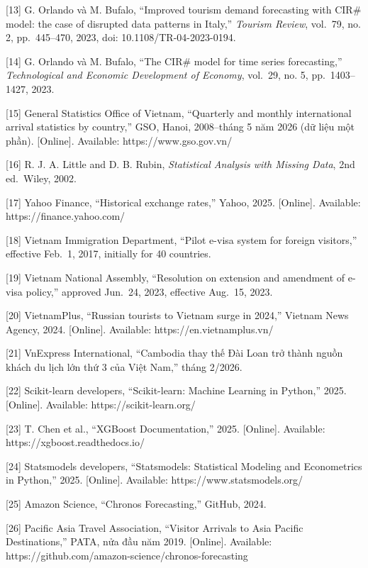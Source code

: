 \documentclass[
]{article}
\begin{document}
{[}13{]} G. Orlando và M. Bufalo, ``Improved tourism demand forecasting
with CIR\# model: the case of disrupted data patterns in Italy,''
\emph{Tourism Review}, vol.~79, no. 2, pp.~445--470, 2023, doi:
10.1108/TR-04-2023-0194.

{[}14{]} G. Orlando và M. Bufalo, ``The CIR\# model for time series
forecasting,'' \emph{Technological and Economic Development of Economy},
vol.~29, no. 5, pp.~1403--1427, 2023.

{[}15{]} General Statistics Office of Vietnam, ``Quarterly and monthly
international arrival statistics by country,'' GSO, Hanoi, 2008--tháng 5
năm 2026 (dữ liệu một phần). {[}Online{]}. Available:
https://www.gso.gov.vn/

{[}16{]} R. J. A. Little and D. B. Rubin, \emph{Statistical Analysis
with Missing Data}, 2nd ed.~Wiley, 2002.

{[}17{]} Yahoo Finance, ``Historical exchange rates,'' Yahoo, 2025.
{[}Online{]}. Available: https://finance.yahoo.com/

{[}18{]} Vietnam Immigration Department, ``Pilot e-visa system for
foreign visitors,'' effective Feb.~1, 2017, initially for 40 countries.

{[}19{]} Vietnam National Assembly, ``Resolution on extension and
amendment of e-visa policy,'' approved Jun.~24, 2023, effective Aug.~15,
2023.

{[}20{]} VietnamPlus, ``Russian tourists to Vietnam surge in 2024,''
Vietnam News Agency, 2024. {[}Online{]}. Available:
https://en.vietnamplus.vn/

{[}21{]} VnExpress International, ``Cambodia thay thế Đài Loan trở thành
nguồn khách du lịch lớn thứ 3 của Việt Nam,'' tháng 2/2026.

{[}22{]} Scikit-learn developers, ``Scikit-learn: Machine Learning in
Python,'' 2025. {[}Online{]}. Available: https://scikit-learn.org/

{[}23{]} T. Chen et al., ``XGBoost Documentation,'' 2025. {[}Online{]}.
Available: https://xgboost.readthedocs.io/

{[}24{]} Statsmodels developers, ``Statsmodels: Statistical Modeling and
Econometrics in Python,'' 2025. {[}Online{]}. Available:
https://www.statsmodels.org/

{[}25{]} Amazon Science, ``Chronos Forecasting,'' GitHub, 2024.

{[}26{]} Pacific Asia Travel Association, ``Visitor Arrivals to Asia
Pacific Destinations,'' PATA, nửa đầu năm 2019. {[}Online{]}. Available:
https://github.com/amazon-science/chronos-forecasting
\end{document}
